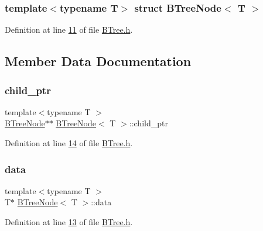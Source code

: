 \subsubsection*{template$<$typename T$>$\newline
struct B\+Tree\+Node$<$ T $>$}



Definition at line \hyperlink{BTree_8h_source_l00011}{11} of file \hyperlink{BTree_8h_source}{B\+Tree.\+h}.



\subsection{Member Data Documentation}
\mbox{\label{structBTreeNode_a723857b74be44c1921f17e177432a844}} 
\subsubsection{\texorpdfstring{child\+\_\+ptr}{child\_ptr}}
{\footnotesize\ttfamily template$<$typename T $>$ \\
\hyperlink{structBTreeNode}{B\+Tree\+Node}$\ast$$\ast$ \hyperlink{structBTreeNode}{B\+Tree\+Node}$<$ T $>$\+::child\+\_\+ptr}



Definition at line \hyperlink{BTree_8h_source_l00014}{14} of file \hyperlink{BTree_8h_source}{B\+Tree.\+h}.

\mbox{\label{structBTreeNode_af877c66e47b110ed0f05e95351003531}} 
\subsubsection{\texorpdfstring{data}{data}}
{\footnotesize\ttfamily template$<$typename T $>$ \\
T$\ast$ \hyperlink{structBTreeNode}{B\+Tree\+Node}$<$ T $>$\+::data}



Definition at line \hyperlink{BTree_8h_source_l00013}{13} of file \hyperlink{BTree_8h_source}{B\+Tree.\+h}.

\mbox{\label{structBTreeNode_a8350f9ddcf6e2323413d9d061c382ea6}} 

